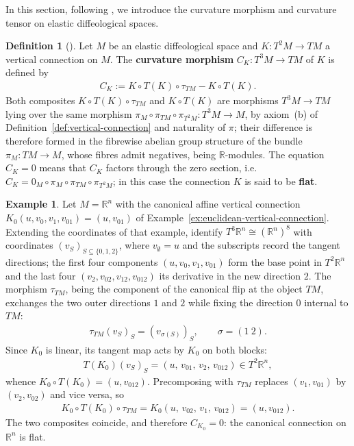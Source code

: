 \documentclass{amsart}
\newcommand{\R}{\mathbb{R}}
\theoremstyle{definition}
\newtheorem{defn}[thm]{Definition}
\newtheorem{ex}[thm]{Example}
\begin{document}
In this section, following \cite[Section~3.16]{CC17}, we introduce the curvature
morphism and curvature tensor on elastic diffeological spaces.

\begin{defn}[{\cite[Definition~3.20]{CC17}}]\label{def:curvature-morphism}
  Let $M$ be an elastic diffeological space and $K \colon T^2M \to TM$ a vertical
  connection on $M$. The \textbf{curvature morphism} $C_K \colon T^3M \to TM$ of $K$
  is defined by
  \begin{align*}
    C_K := K \circ T(K) \circ \tau_{TM} - K \circ T(K).
  \end{align*}
 Both composites $K \circ T(K) \circ \tau_{TM}$ and $K \circ T(K)$ are morphisms $T^3M \to TM$ lying over the same morphism $\pi_M \circ \pi_{TM} \circ \pi_{T^2M} \colon T^3M \to M$, by axiom~(b) of Definition~\ref{def:vertical-connection} and naturality of $\pi$; their difference is therefore formed in the fibrewise abelian group structure of the bundle $\pi_M \colon TM \to M$, whose fibres admit negatives, being $\R$-modules. 
 The equation $C_K = 0$ means that $C_K$ factors through the zero section, i.e.\ $C_K = 0_M \circ \pi_M \circ \pi_{TM} \circ \pi_{T^2M}$; in this case the connection $K$ is said to be \textbf{flat}.
\end{defn}


\begin{ex}\label{ex:flat-euclidean}
  Let $M = \R^n$ with the canonical affine vertical connection
  $K_0(u, v_0, v_1, v_{01}) = (u, v_{01})$ of
  Example~\ref{ex:euclidean-vertical-connection}. Extending the coordinates
  of that example, identify $T^3\R^n \cong (\R^n)^{8}$ with coordinates
  $(v_S)_{S \subseteq \{0,1,2\}}$, where $v_\emptyset = u$ and the
  subscripts record the tangent directions; the first four components
  $(u, v_0, v_1, v_{01})$ form the base point in $T^2\R^n$ and the last
  four $(v_2, v_{02}, v_{12}, v_{012})$ its derivative in the new
  direction $2$. The morphism $\tau_{TM}$, being the component of the
  canonical flip at the object $TM$, exchanges the two outer directions
  $1$ and $2$ while fixing the direction $0$ internal to $TM$:
  \begin{align*}
    \tau_{TM}(v_S)_S = (v_{\sigma(S)})_S, \qquad \sigma = (1\ 2).
  \end{align*}
  Since $K_0$ is linear, its tangent map acts by $K_0$ on both blocks:
  \begin{align*}
    T(K_0)(v_S)_S = (u,\, v_{01},\, v_2,\, v_{012}) \in T^2\R^n,
  \end{align*}
  whence $K_0 \circ T(K_0) = (u, v_{012})$. Precomposing with
  $\tau_{TM}$ replaces $(v_1, v_{01})$ by $(v_2, v_{02})$ and vice versa,
  so
  \begin{align*}
    K_0 \circ T(K_0) \circ \tau_{TM}
      = K_0(u,\, v_{02},\, v_1,\, v_{012}) = (u, v_{012}).
  \end{align*}
  The two composites coincide, and therefore $C_{K_0} = 0$: the canonical
  connection on $\R^n$ is flat.
\end{ex}
\end{document}
